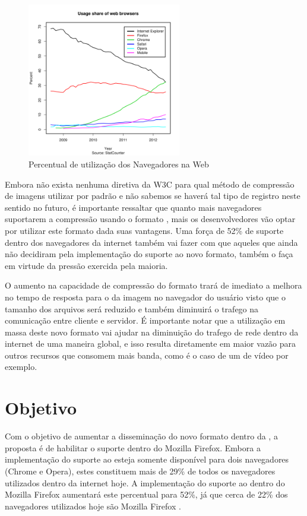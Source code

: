 \documentclass[espaco=simples,appendix=Name]{abnt}
\begin{document}
\begin{description}
\begin{figure}[h]
  \centering
    \includegraphics[width=0.6\textwidth]{BrowserCounter.png}
  \caption{Percentual de utilização dos Navegadores na Web \protect\cite{BrowserStats}}
\end{figure}

Embora não exista nenhuma diretiva da W3C para qual método de compressão de imagens utilizar por padrão e não sabemos se haverá tal tipo de registro neste sentido no futuro, é importante ressaltar que quanto mais navegadores suportarem a compressão usando o formato , mais os desenvolvedores vão optar por utilizar este formato dada suas vantagens. Uma força de 52\% de suporte dentro dos navegadores da internet também vai fazer com que aqueles que ainda não decidiram pela implementação do suporte ao novo formato, também o faça em virtude da pressão exercida pela maioria.

O aumento na capacidade de compressão do formato  trará de imediato a melhora no tempo de resposta para o  da imagem no navegador do usuário visto que o tamanho dos arquivos será reduzido e também diminuirá o trafego na comunicação entre cliente e servidor. É importante notar que a utilização em massa deste novo formato vai ajudar na diminuição do trafego de rede dentro da internet de uma maneira global, e isso resulta diretamente em maior vazão para outros recursos que consomem mais banda, como é o caso de um  de vídeo por exemplo.

\section{Objetivo}

\item \noindent
Com o objetivo de aumentar a disseminação do novo formato dentro da , a proposta é de habilitar o suporte dentro do Mozilla Firefox. Embora a implementação do suporte ao  esteja somente disponível para dois navegadores (Chrome e Opera), estes constituem mais de 29\% de todos os navegadores utilizados dentro da internet hoje. A implementação do suporte ao  dentro do Mozilla Firefox aumentará este percentual para 52\%, já que cerca de 22\% dos navegadores utilizados hoje são Mozilla Firefox \cite{BrowserStats}.


\end{description}
\end{document}
